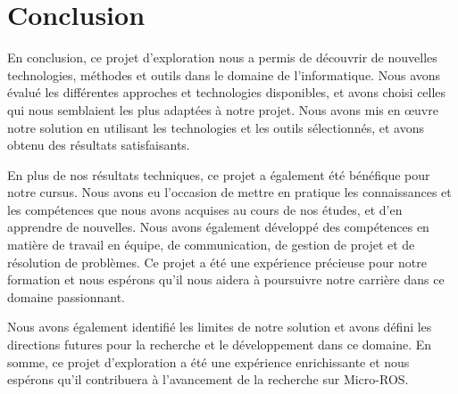	\chapter{Conclusion}
 
En conclusion, ce projet d'exploration nous a permis de découvrir de nouvelles technologies, méthodes et outils dans le domaine de 
l'informatique. Nous avons évalué les différentes approches et technologies disponibles, et avons choisi celles qui nous 
semblaient les plus adaptées à notre projet. Nous avons mis en œuvre notre solution en utilisant les technologies et les outils 
sélectionnés, et avons obtenu des résultats satisfaisants. 
\linebreak

En plus de nos résultats techniques, ce projet a également été bénéfique pour notre cursus. Nous avons eu l'occasion de mettre en 
pratique les connaissances et les compétences que nous avons acquises au cours de nos études, et d'en apprendre de nouvelles.
Nous avons également développé des compétences en matière de travail en équipe, de communication, de gestion de projet et de 
résolution de problèmes. Ce projet a été une expérience précieuse pour notre formation et nous espérons qu'il nous aidera à poursuivre
notre carrière dans ce domaine passionnant. 
\linebreak

Nous avons également identifié les limites de notre solution et avons défini les directions futures pour la recherche et le 
développement dans ce domaine. En somme, ce projet d'exploration a été une expérience enrichissante et nous espérons qu'il contribuera 
à l'avancement de la recherche sur Micro-ROS. 